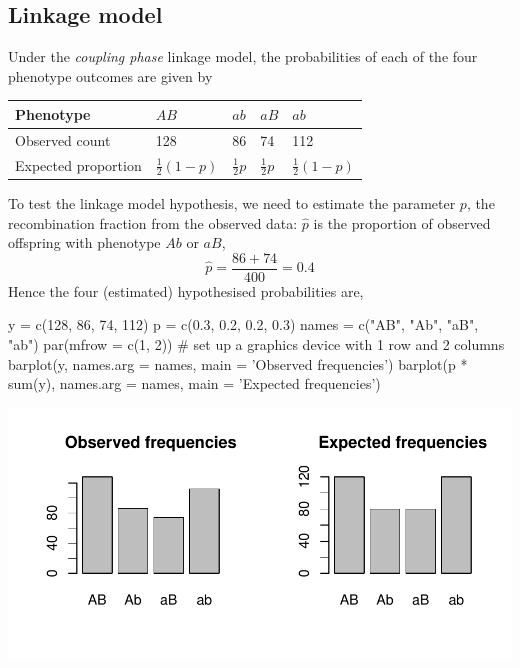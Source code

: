 \documentclass[a4paper]{article}
\begin{document}
\subsection{Linkage model}
Under the \textit{coupling phase} linkage model, the probabilities of each of the four phenotype outcomes are given by
\begin{table}[H]
	\centering
	\begin{tabular}{@{}lllll@{}}
	\textbf{Phenotype} 	& \( AB \)				 & \( ab \) 		  & \( aB \) 		   & \( ab \) 				\\ \midrule
	Observed count		& 128					 & 86				  & 74		 		   & 112					\\ \midrule
	Expected proportion & \( \frac{1}{2}(1-p) \) & \( \frac{1}{2}p \) & \( \frac{1}{2}p \) & \( \frac{1}{2}(1-p) \) \\ 
	\end{tabular}
\end{table}
To test the linkage model hypothesis, we need to estimate the parameter \( p \), the recombination fraction from the observed data: \( \hat{p} \) is the proportion of observed offspring with phenotype \( Ab \) or \( aB \),
\[
	\hat{p} = \frac{86 + 74}{400} = 0.4
\]
Hence the four (estimated) hypothesised probabilities are,
\begin{Schunk}
\begin{Sinput}
y = c(128, 86, 74, 112)
p = c(0.3, 0.2, 0.2, 0.3)
names = c("AB", "Ab", "aB", "ab")
par(mfrow = c(1, 2)) # set up a graphics device with 1 row and 2 columns
barplot(y, names.arg = names, main = 'Observed frequencies')
barplot(p * sum(y), names.arg = names, main = 'Expected frequencies')
\end{Sinput}


{\centering \includegraphics[width=\maxwidth]{figure/listings-unnamed-chunk-26-1} 

}

\end{Schunk}
\end{document}
